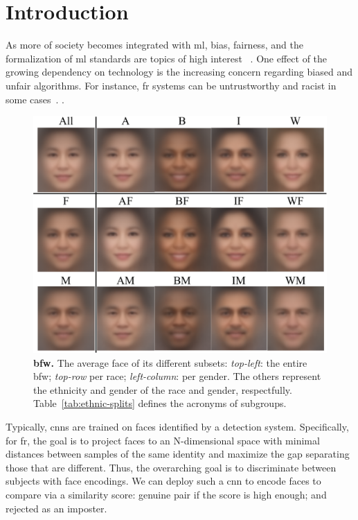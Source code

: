 \glsresetall
\section{Introduction}
As more of society becomes integrated with \gls{ml}, bias, fairness, and the formalization of \gls{ml} standards are topics of high interest ~\cite{10.1007/978-3-030-13469-3_68, anne2018women, wang2018racial}. One effect of the growing dependency on technology is the increasing concern regarding biased and unfair algorithms.  For instance, \gls{fr} systems can be untrustworthy and racist in some cases~\cite{england2019,snow2018}.
. 

\begin{figure}[t!]
\centering
         \includegraphics[trim=0in 0.2in 0in 0in,clip,width=.9\linewidth]{figures/montage.pdf}
\caption{\textbf{\gls{bfw}.} The average face of its different subsets: \emph{top-left}: the entire \gls{bfw}; \emph{top-row} per race;  \emph{left-column}: per gender. The others represent the ethnicity and gender of the race and gender, respectfully. Table~\ref{tab:ethnic-splits} defines the acronyms of subgroups.}
\label{fig:avg-faces}
\end{figure}

Typically, \glspl{cnn} are trained on faces identified by a detection system. Specifically, for \gls{fr}, the goal is to project faces to an N-dimensional space with minimal distances between samples of the same identity and maximize the gap separating those that are different. Thus, the overarching goal is to discriminate between subjects with face encodings. We can deploy such a \gls{cnn} to encode faces to compare via a similarity score: genuine pair if the score is high enough; and rejected as an imposter. 

